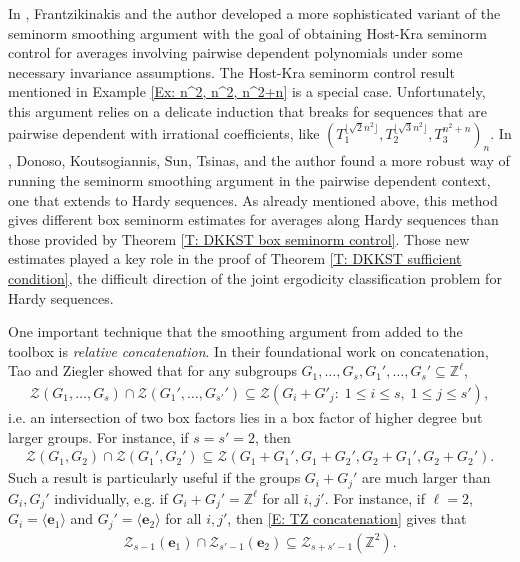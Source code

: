 \documentclass[11pt]{amsart}
\theoremstyle{definition}
\newcommand{\Z}{{\mathbb Z}}
\newcommand{\CZ}{{\mathcal Z}}
\newcommand{\be}{{\mathbf{e}}}
\newcommand{\1}{{\mathbf{1}}}
\newcommand{\sfloor}[1]{{\lfloor #1 \rfloor}}
\begin{document}
In \cite{FrKu22b}, Frantzikinakis and the author developed a more sophisticated variant of the seminorm smoothing argument with the goal of obtaining Host-Kra seminorm control for averages involving pairwise dependent polynomials under some necessary invariance assumptions. The Host-Kra seminorm control result mentioned in Example \ref{Ex: n^2, n^2, n^2+n} is a special case. Unfortunately, this argument relies on a delicate induction that breaks for sequences that are pairwise dependent with irrational coefficients, like $(T_1^{\sfloor{\sqrt{2}n^2}}, T_2^{\sfloor{\sqrt{3}n^2}}, T_3^{n^2+n})_n$. In \cite[Section 4]{DKKST25}, Donoso, Koutsogiannis, Sun, Tsinas, and the author found a more robust way of running the seminorm smoothing argument in the pairwise dependent context, one that extends to Hardy sequences. As already mentioned above, this method gives different box seminorm estimates for averages along Hardy sequences than those provided by Theorem \ref{T: DKKST box seminorm control}. Those new estimates played a key role in the proof of Theorem \ref{T: DKKST sufficient condition}, the difficult direction of the joint ergodicity classification problem for Hardy sequences.

One important technique that the smoothing argument from \cite{DKKST25} added to the toolbox is \textit{relative concatenation}. In their foundational work on concatenation, Tao and Ziegler \cite[Theorem 1.16]{TZ16} showed that for any subgroups $G_1, \ldots, G_s, G_1',\ldots, G_s'\subseteq \Z^\ell$,
\begin{align}\label{E: TZ concatenation}
    \CZ(G_1, \ldots, G_s) \cap \CZ(G_1', \ldots, G_{s'}')\subseteq \CZ(G_i + G'_j\colon\; 1\leq i\leq s,\; 1\leq j\leq s'),
\end{align}
i.e. an intersection of two box factors lies in a box factor of higher degree but larger groups. For instance, if $s=s'=2$, then
\begin{align*}
    \CZ(G_1, G_2)\cap\CZ(G_1', G_2')\subseteq \CZ(G_1 + G_1', G_1 + G_2', G_2+G_1', G_2+G_2').
\end{align*}
Such a result is particularly useful if the groups $G_i + G_j'$ are much larger than $G_i,G_j'$ individually, e.g. if $G_i + G_j' = \Z^\ell$ for all $i,j'$. For instance, if $\ell = 2$, $G_i = \langle \be_1\rangle$ and $G_j' = \langle \be_2\rangle$ for all $i,j'$, then \eqref{E: TZ concatenation} gives that
\begin{align*}
    \CZ_{s-1}(\be_1) \cap \CZ_{s'-1}(\be_2) \subseteq \CZ_{s+s'-1}(\Z^2).
\end{align*}
\end{document}

